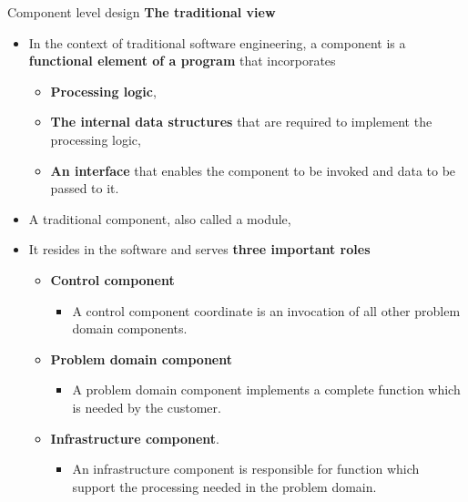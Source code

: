 \documentclass{beamer}
\begin{document}
\begin{frame}{Component level design }
	\textbf{The traditional view}
	\begin{itemize}
		\item In the context of traditional software engineering, a component is a \textbf{functional element of a program }that incorporates 
		\begin{itemize}
			\item \textbf{Processing logic}, 
			\item \textbf{The internal data structures} that are required to implement the processing logic, 
			\item\textbf{ An interface} that enables the component to be invoked and data to be passed to it. 
		\end{itemize}
	\item A traditional component, also called a module,
		\item It resides in the software and serves\textbf{ three important roles} 
		\begin{itemize}
			\item \textbf{Control component}
			\begin{itemize}
				\item A control component coordinate is an invocation of all other problem domain components.
			\end{itemize}
			\item  \textbf{Problem domain component }
				\begin{itemize}
				\item A problem domain component implements a complete function which is needed by the customer.
			\end{itemize}
			\item \textbf{Infrastructure component}.
				\begin{itemize}
				\item An infrastructure component is responsible for function which support the processing needed in the problem domain.
			\end{itemize}
		\end{itemize}
	\end{itemize}
\end{frame}
\end{document}
